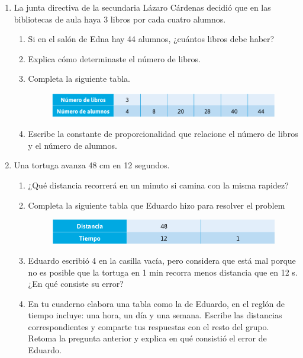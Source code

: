 \documentclass[11pt]{book}
\begin{document}
\begin{enumerate}
  \item La junta directiva de la secundaria Lázaro Cárdenas decidió que en las bibliotecas
        de aula haya 3 libros por cada cuatro alumnos.
        \begin{enumerate}
          \item Si en el salón de Edna hay 44 alumnos, ¿cuántos libros debe haber?
          \item Explica cómo determinaste el número de libros.
          \item Completa la siguiente tabla.
                \begin{figure}[H]
                  \centering
                  \includegraphics[width=0.6\linewidth]{tablaLibrosAlumnos.png}
                  \label{fig:tablaLibrosAlumnos}
                \end{figure}
          \item Escribe la constante de proporcionalidad que relacione el número de libros y el
                número de alumnos.
        \end{enumerate}
  \item  Una tortuga avanza 48 cm en 12 segundos.
        \begin{enumerate}
          \item ¿Qué distancia recorrerá en un minuto si camina con la misma rapidez?
          \item Completa la siguiente tabla que Eduardo hizo para resolver el problem
                \begin{figure}[H]
                  \centering
                  \includegraphics[width=0.6\linewidth]{tablaDistanciaTiempo.png}
                  \label{fig:tablaDistanciaTiempo}
                \end{figure}
          \item Eduardo escribió 4 en la casilla vacía, pero considera que está mal porque no es
                posible que la tortuga en 1 min recorra menos distancia que en 12 s. ¿En qué
                consiste su error?
          \item En tu cuaderno elabora una tabla como la de Eduardo, en el reglón de tiempo
                incluye: una hora, un día y una semana. Escribe las distancias correspondientes
                y comparte tus respuestas con el resto del grupo. Retoma la pregunta anterior y
                explica en qué consistió el error de Eduardo.
        \end{enumerate}



\end{enumerate}
\end{document}
